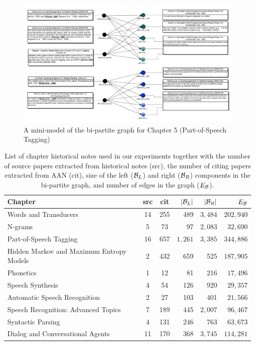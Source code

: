 
\begin{figure}[ht!]
\centering
\includegraphics[width=\textwidth]{graph/bipartite_graph.png}
\caption{A mini-model of the bi-partite graph for Chapter 5 (Part-of-Speech Tagging)}\label{fig:bi}
\end{figure}

\begin{table}
\centering
{\scriptsize
\begin{tabular}{|l|cc|rrr|}
  \hline
 Chapter & src & cit & $|\B_L|$ & $|\B_R|$ & $E_\B$ \\
  \hline \hline
 Words and Transducers & 14&     255&    489&    $3,484$ &   $202,940$ \\
 N-grams & 5&      73&     97&     $2,083$ &   $32,690$ \\
 Part-of-Speech Tagging & 16&     657&    $1,261$ &   $3,385$ &   $344,886$\\
 Hidden Markov and Maximum Entropy Models & 2&      432&    659&    525&    $187,905$\\
 Phonetics & 1&      12&     81&     216&    $17,496$\\
 Speech Synthesis & 4&      54&     126&    920&    $29,357$\\
 Automatic Speech Recognition & 2&      27&     103&    401&    $21,566$\\
 Speech Recognition: Advanced Topics & 7&      189&    445&    $2,007$&   $96,467$\\
 Syntactic Parsing & 4&      131&    246&    763&    $63,673$\\
 Dialog and Conversational Agents & 11&     170&    368&    $3,745$ &   $114,281$\\
  \hline
\end{tabular}}
\caption{List of chapter historical notes used in our experiments together with the number of source papers extracted from historical notes (src), the number of citing papers extracted from AAN (cit), size of the left ($\B_L$) and right ($\B_R$) components in the bi-partite graph, and number of edges in the graph ($E_\B$).}\label{tbl:chapters}
\end{table}

